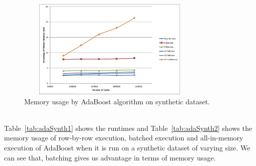\begin{figure}[ht]
\centering
\includegraphics[width=0.8\textwidth,height=180px]{ada4.png}
\caption{Memory usage by AdaBoost algorithm on synthetic dataset.}
\label{fig:adamem}
\end{figure}

~~\\
Table~\ref{tab:adaSynth1} shows the runtimes and Table~\ref{tab:adaSynth2} shows the memory usage of row-by-row execution, batched execution and all-in-memory execution of AdaBoost when it is run on a synthetic dataset of varying size. We can see that, batching gives us advantage in terms of memory usage.




